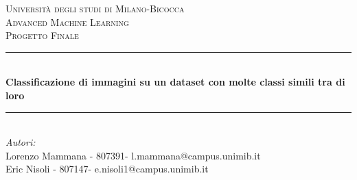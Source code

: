 \begin{titlepage}

\newcommand{\HRule}{\rule{\linewidth}{0.5mm}} %

\center %
 

\textsc{\LARGE Università degli studi di Milano-Bicocca}\\[1cm] %
\textsc{\Large Advanced Machine Learning }\\[0.3cm] %
\textsc{\large Progetto Finale}\\[0.1cm] %


\HRule \\[0.4cm]
{ \huge \bfseries Classificazione di immagini su un dataset con molte classi simili tra di loro}\\[0.4cm] %
\HRule \\[1.5cm]
 

\large
\emph{Autori:}\\
Lorenzo Mammana - 807391- l.mammana@campus.unimib.it \\   %
Eric Nisoli - 807147- e.nisoli1@campus.unimib.it   \\[1cm] %




\end{titlepage}
